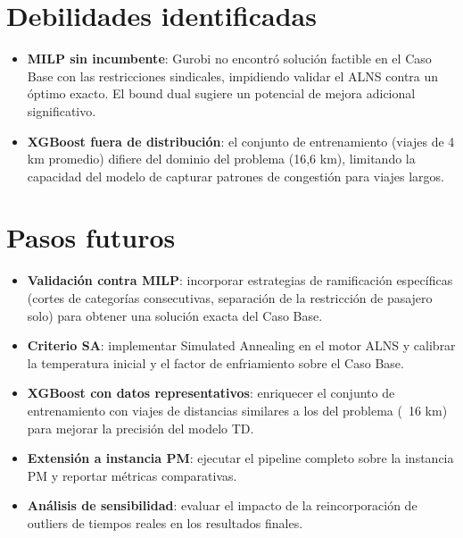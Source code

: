 \section{Debilidades identificadas}

\begin{itemize}
    \item \textbf{MILP sin incumbente}: Gurobi no encontró solución factible en el Caso Base con las restricciones sindicales, impidiendo validar el ALNS contra un óptimo exacto. El bound dual sugiere un potencial de mejora adicional significativo.
    \item \textbf{XGBoost fuera de distribución}: el conjunto de entrenamiento (viajes de 4 km promedio) difiere del dominio del problema (16,6 km), limitando la capacidad del modelo de capturar patrones de congestión para viajes largos.
  
\end{itemize}

\section{Pasos futuros}

\begin{itemize}
    \item \textbf{Validación contra MILP}: incorporar estrategias de ramificación específicas (cortes de categorías consecutivas, separación de la restricción de pasajero solo) para obtener una solución exacta del Caso Base.
    \item \textbf{Criterio SA}: implementar Simulated Annealing en el motor ALNS y calibrar la temperatura inicial y el factor de enfriamiento sobre el Caso Base.
    \item \textbf{XGBoost con datos representativos}: enriquecer el conjunto de entrenamiento con viajes de distancias similares a los del problema (~16 km) para mejorar la precisión del modelo TD.
    \item \textbf{Extensión a instancia PM}: ejecutar el pipeline completo sobre la instancia PM y reportar métricas comparativas.
    \item \textbf{Análisis de sensibilidad}: evaluar el impacto de la reincorporación de outliers de tiempos reales en los resultados finales.
\end{itemize}
